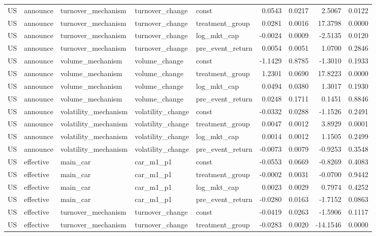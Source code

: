 \begin{tabular}{lllllrrrr}
US & announce & turnover_mechanism & turnover_change & const & 0.0543 & 0.0217 & 2.5067 & 0.0122 \\
US & announce & turnover_mechanism & turnover_change & treatment_group & 0.0281 & 0.0016 & 17.3798 & 0.0000 \\
US & announce & turnover_mechanism & turnover_change & log_mkt_cap & -0.0024 & 0.0009 & -2.5135 & 0.0120 \\
US & announce & turnover_mechanism & turnover_change & pre_event_return & 0.0054 & 0.0051 & 1.0700 & 0.2846 \\
US & announce & volume_mechanism & volume_change & const & -1.1429 & 0.8785 & -1.3010 & 0.1933 \\
US & announce & volume_mechanism & volume_change & treatment_group & 1.2301 & 0.0690 & 17.8223 & 0.0000 \\
US & announce & volume_mechanism & volume_change & log_mkt_cap & 0.0494 & 0.0380 & 1.3017 & 0.1930 \\
US & announce & volume_mechanism & volume_change & pre_event_return & 0.0248 & 0.1711 & 0.1451 & 0.8846 \\
US & announce & volatility_mechanism & volatility_change & const & -0.0332 & 0.0288 & -1.1526 & 0.2491 \\
US & announce & volatility_mechanism & volatility_change & treatment_group & 0.0047 & 0.0012 & 3.8929 & 0.0001 \\
US & announce & volatility_mechanism & volatility_change & log_mkt_cap & 0.0014 & 0.0012 & 1.1505 & 0.2499 \\
US & announce & volatility_mechanism & volatility_change & pre_event_return & -0.0073 & 0.0079 & -0.9253 & 0.3548 \\
US & effective & main_car & car_m1_p1 & const & -0.0553 & 0.0669 & -0.8269 & 0.4083 \\
US & effective & main_car & car_m1_p1 & treatment_group & -0.0002 & 0.0031 & -0.0700 & 0.9442 \\
US & effective & main_car & car_m1_p1 & log_mkt_cap & 0.0023 & 0.0029 & 0.7974 & 0.4252 \\
US & effective & main_car & car_m1_p1 & pre_event_return & -0.0280 & 0.0163 & -1.7152 & 0.0863 \\
US & effective & turnover_mechanism & turnover_change & const & -0.0419 & 0.0263 & -1.5906 & 0.1117 \\
US & effective & turnover_mechanism & turnover_change & treatment_group & -0.0283 & 0.0020 & -14.1546 & 0.0000 \\

\end{tabular}
